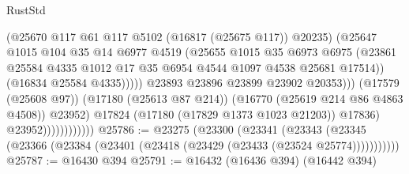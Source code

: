 \begin{lexlean}{RustStd}
\begin{coremodule}
                                            (@25670
                                              @117
                                              @61
                                              @117
                                              @5102
                                              (@16817 (@25675 @117))
                                              @20235)
                                            (@25647
                                              @1015
                                              @104
                                              @35
                                              @14
                                              @6977
                                              @4519
                                              (@25655
                                                @1015
                                                @35
                                                @6973
                                                @6975
                                                (@23861
                                                  @25584
                                                  @4335
                                                  @1012
                                                  @17
                                                  @35
                                                  @6954
                                                  @4544
                                                  @1097
                                                  @4538
                                                  @25681
                                                  @17514))
                                              (@16834 @25584 @4335)))))
                                      @23893
                                      @23896
                                      @23899
                                      @23902
                                      @20353)))
                                (@17579 (@25608 @97))
                                (@17180 (@25613 @87 @214))
                                (@16770 (@25619 @214 @86 @4863 @4508))
                                @23952)
                              @17824
                              (@17180 (@17829 @1373 @1023 @21203))
                              @17836)
                            @23952))))))))))))
@25786 := @23275
    (@23300
      (@23341
        (@23343 (@23345 (@23366 (@23384 (@23401 (@23418 (@23429 (@23433 (@23524 @25774)))))))))))
@25787 := @16430 @394
@25791 := @16432 (@16436 @394) (@16442 @394)

\end{coremodule}
\end{lexlean}

